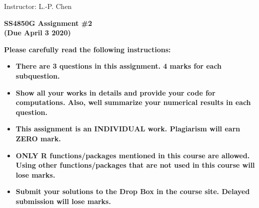 \documentclass[11pt]{article}
\begin{document}
\hfill Instructor: L.-P. Chen

\begin{center}
\Large{\bf SS4850G Assignment \#2 
\\(Due April 3 2020)}
\end{center}

{\bf Please carefully read the following instructions:}

\begin{itemize}

\item {\bf There are 3 questions in this assignment. 4 marks for each subquestion.}

\item  {\bf Show all your works in details and provide your code for computations. Also, well summarize your numerical results in each question.}

\item {\bf This assignment is an INDIVIDUAL work. Plagiarism will earn ZERO mark.}

\item {\bf ONLY R functions/packages mentioned in this course are allowed.  Using other functions/packages that are not used in this course will lose marks.}


\item {\bf Submit your solutions to the Drop Box in the course site. Delayed submission will lose marks.}

\end{itemize}

\clearpage
\end{document}
